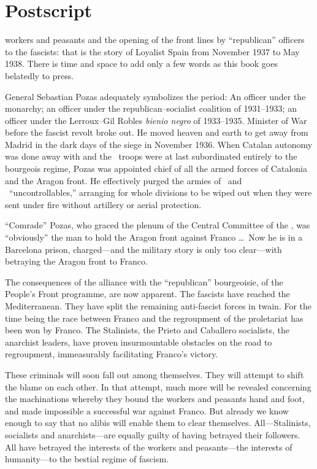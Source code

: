 \chapter{Postscript}

 workers and peasants and the opening of the front lines by ``republican'' officers to the fascists: that is the story of Loyalist Spain from November 1937 to May 1938. There is time and space to add only a few words as this book goes belatedly to press.

General Sebastian Pozas adequately symbolizes the period: An officer under the monarchy; an officer under the republican--socialist coalition of 1931--1933; an officer under the Lerroux--Gil Robles \emph{bienio negro} of 1933--1935. Minister of War before the fascist revolt broke out. He moved heaven and earth to get away from Madrid in the dark days of the siege in November 1936. When Catalan autonomy was done away with and the \CNT\ troops were at last subordinated entirely to the bourgeois regime, Pozas was appointed chief of all the armed forces of Catalonia and the Aragon front. He effectively purged the armies of  \CNT\ and \POUM\ ``uncontrollables,'' arranging for whole divisions to be wiped out when they were sent under fire without artillery or aerial protection.

``Comrade'' Pozas, who graced the plenum of the Central Committee of the \PSUC, was ``obviously'' the man to hold the Aragon front against Franco \dots\ Now he is in a Barcelona prison, charged---and the military story is only too clear---with betraying the Aragon front to Franco.

The consequences of the alliance with the ``republican'' bourgeoisie, of the People’s Front programme, are now apparent. The fascists have reached the Mediterranean. They have split the remaining anti-fascist forces in twain. For the time being the race between Franco and the regroupment of the proletariat has been won by Franco. The Stalinists, the Prieto and Caballero socialists, the anarchist leaders, have proven insurmountable obstacles on the road to regroupment, immeasurably facilitating Franco’s victory.

These criminals will soon fall out among themselves. They will attempt to shift the blame on each other. In that attempt, much more will be revealed concerning the machinations whereby they bound the workers and peasants hand and foot, and made impossible a successful war against Franco. But already we know enough to say that no alibis will enable them to clear themselves. All---Stalinists, socialists and anarchists---are equally guilty of having betrayed their followers. All have betrayed the interests of the workers and peasants---the interests of humanity---to the bestial regime of fascism.


